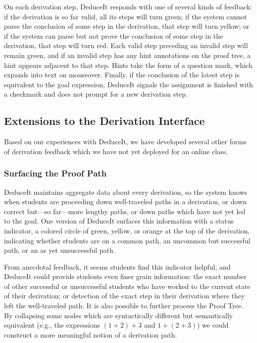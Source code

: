 \documentclass{sigchi}
\newcommand{\msb}[1]{\textbf{\textcolor{cyan}{Michael: #1}}}
\begin{document}
On each derivation step, DeduceIt responds with one of several kinds of feedback: if the derivation is so far valid, all its steps will turn green; if the system cannot parse the conclusion of some step in the derivation, that step will turn yellow; or if the system can parse but not prove the conclusion of some step in the derivation, that step will turn red. Each valid step preceding an invalid step will remain green, and if an invalid step has any hint annotations on the proof tree, a hint appears adjacent to that step. Hints take the form of a question mark, which expands into text on mouseover. Finally, if the conclusion of the latest step is equivalent to the goal expression, DeduceIt signals the assignment is finished with a checkmark and does not prompt for a new derivation step.

\subsection{Extensions to the Derivation Interface}

Based on our experiences with DeduceIt, we have developed several other forms of derivation feedback which we have not yet deployed for an online class.

\subsubsection{Surfacing the Proof Path}

DeduceIt maintains aggregate data about every derivation, so the system knows when students are proceeding down well-traveled paths in a derivation, or down correct but---so far---more lengthy paths, or down paths which have not yet led to the goal. One version of DeduceIt surfaces this information with a status indicator, a colored circle of green, yellow, or orange at the top of the derivation, indicating whether students are on a common path, an uncommon but successful path, or an as yet unsuccessful path. 

From anecdotal feedback, it seems students find this indicator helpful, and DeduceIt could provide students even finer grain information: the exact number of other successful or unsuccessful students who have worked to the current state of their derivation; or detection of the exact step in their derivation where they left the well-traveled path. It is also possible to further process the Proof Tree. By collapsing some nodes which are syntactically different but semantically equivalent (e.g., the expressions $(1+2)+3$ and $1+(2+3)$) we could construct a more meaningful notion of a derivation path. %
\end{document}
